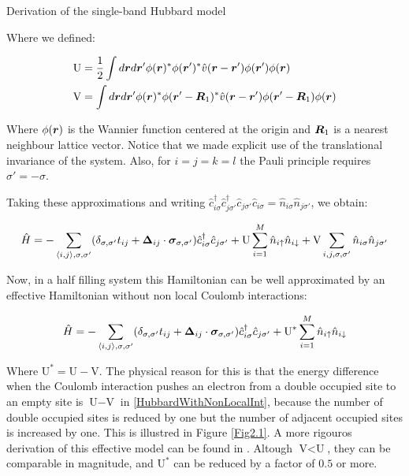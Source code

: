 \begin{section}{Derivation of the single-band Hubbard model}
\begin{itemize}
Where we defined:

\begin{align}
\text{U} &= \frac{1}{2} \int d\boldsymbol{r} d\boldsymbol{r}' \phi(\boldsymbol{r})^* \phi(\boldsymbol{r}')^* \hat{v}(\boldsymbol{r}-\boldsymbol{r}') \phi(\boldsymbol{r}') \phi(\boldsymbol{r}) \\
\text{V} &= \int d\boldsymbol{r} d\boldsymbol{r}' \phi(\boldsymbol{r})^* \phi(\boldsymbol{r}'-\boldsymbol{R}_1)^* \hat{v}(\boldsymbol{r}-\boldsymbol{r}') \phi(\boldsymbol{r}'-\boldsymbol{R}_1) \phi(\boldsymbol{r})
\end{align}

Where $\phi(\boldsymbol{r})$ is the Wannier function centered at the origin and $\boldsymbol{R}_1$ is a nearest neighbour lattice vector. Notice that we made explicit use of the translational invariance of the system. Also, for $i=j=k=l$ the Pauli principle requires $\sigma' = -\sigma$.

\end{itemize}

Taking these approximations and writing $\hat{c}_{i \sigma}^\dagger \hat{c}_{j \sigma'}^\dagger \hat{c}_{j \sigma'} \hat{c}_{i \sigma} = \hat{n}_{i \sigma} \hat{n}_{j \sigma'}$, we obtain:

\begin{equation}
\label{HubbardWithNonLocalInt}
\hat{H} = -\sum_{\langle i,j \rangle, \sigma, \sigma'}(\delta_{\sigma, \sigma'} t_{ij} + \boldsymbol{\Delta}_{ij} \cdot \boldsymbol{\sigma}_{\sigma, \sigma'})\hat{c}_{i \sigma}^\dagger \hat{c}_{j \sigma'} + \text{U} \sum_{i=1}^M \hat{n}_{i\uparrow}\hat{n}_{i\downarrow} + \text{V} \sum_{i,j,\sigma,\sigma'}  \hat{n}_{i \sigma} \hat{n}_{j \sigma'}
\end{equation}

Now, in a half filling system this Hamiltonian can be well approximated by an effective Hamiltonian without non local Coulomb interactions:

\begin{equation}
\label{Intermediate}
\hat{H} = -\sum_{\langle i,j \rangle, \sigma, \sigma'}(\delta_{\sigma, \sigma'} t_{ij} + \boldsymbol{\Delta}_{ij} \cdot\boldsymbol{\sigma}_{\sigma, \sigma'})\hat{c}_{i \sigma}^\dagger \hat{c}_{j \sigma'} + \text{U}^* \sum_{i=1}^M \hat{n}_{i\uparrow}\hat{n}_{i\downarrow}
\end{equation}

Where $\text{U}^* = \text{U} - \text{V}$. The physical reason for this is that the energy difference when the Coulomb interaction pushes an electron from a double occupied site to an empty site is $\text{U}-\text{V}$ in \ref{HubbardWithNonLocalInt}, because the number of double occupied sites is reduced by one but the number of adjacent occupied sites is increased by one. This is illustred in Figure \ref{Fig2.1}. A more rigouros derivation of this effective model can be found in \cite{Schuler2013}. Altough $\text{V} < \text{U}$, they can be comparable in magnitude, and $\text{U}^*$ can be reduced by a factor of $0.5$ or more.


\end{section}
